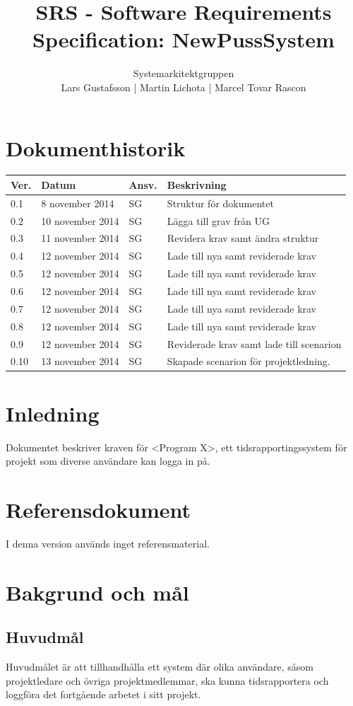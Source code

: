 \documentclass[a4paper]{article}
\title{SRS - Software Requirements Specification: NewPussSystem}
\author{Systemarkitektgruppen \\ Lars Gustafsson | Martin Lichota | Marcel Tovar Rascon}
\date{}
\begin{document}
\maketitle
\thispagestyle{fancy}
\tableofcontents
\newpage

\section*{Dokumenthistorik}

\begin{tabular}{ l l l l }
Ver. & Datum & Ansv. & Beskrivning \\\hline
0.1 & 8 november 2014 & SG & Struktur för dokumentet\\
0.2 & 10 november 2014 & SG & Lägga till grav från UG\\
0.3 & 11 november 2014 & SG & Revidera krav samt ändra struktur\\
0.4 & 12 november 2014 & SG & Lade till nya samt reviderade krav\\
0.5 & 12 november 2014 & SG & Lade till nya samt reviderade krav\\
0.6 & 12 november 2014 & SG & Lade till nya samt reviderade krav\\
0.7 & 12 november 2014 & SG & Lade till nya samt reviderade krav\\
0.8 & 12 november 2014 & SG & Lade till nya samt reviderade krav\\
0.9 & 12 november 2014 & SG & Reviderade krav samt lade till scenarion\\
0.10 & 13 november 2014 & SG & Skapade scenarion för projektledning.\\
\end{tabular}
\section{Inledning}       


Dokumentet beskriver kraven för <Program X>, ett tidsrapportingssystem för projekt som diverse användare kan logga in på.

\section{Referensdokument}
I denna version används inget referensmaterial.
\section{Bakgrund och mål}   
\subsection{Huvudmål}
Huvudmålet är att tillhandhålla ett system där olika användare, såsom projektledare och övriga projektmedlemmar, ska kunna tidsrapportera och loggföra det fortgående arbetet i sitt projekt. 
\end{document}
